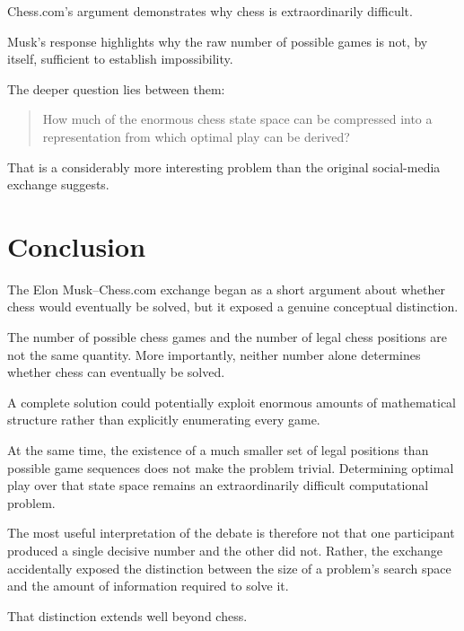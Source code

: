 \documentclass[12pt,a4paper]{article}
\begin{document}
Chess.com's argument demonstrates why chess is extraordinarily
difficult.

Musk's response highlights why the raw number of possible games is
not, by itself, sufficient to establish impossibility.

The deeper question lies between them:

\begin{quote}
    How much of the enormous chess state space can be compressed into
    a representation from which optimal play can be derived?
\end{quote}

That is a considerably more interesting problem than the original
social-media exchange suggests.


\section{Conclusion}

The Elon Musk--Chess.com exchange began as a short argument about
whether chess would eventually be solved, but it exposed a genuine
conceptual distinction.

The number of possible chess games and the number of legal chess
positions are not the same quantity. More importantly, neither number
alone determines whether chess can eventually be solved.

A complete solution could potentially exploit enormous amounts of
mathematical structure rather than explicitly enumerating every game.

At the same time, the existence of a much smaller set of legal
positions than possible game sequences does not make the problem
trivial. Determining optimal play over that state space remains an
extraordinarily difficult computational problem.

The most useful interpretation of the debate is therefore not that
one participant produced a single decisive number and the other did
not. Rather, the exchange accidentally exposed the distinction between
the size of a problem's search space and the amount of information
required to solve it.

That distinction extends well beyond chess.

\newpage
\end{document}

